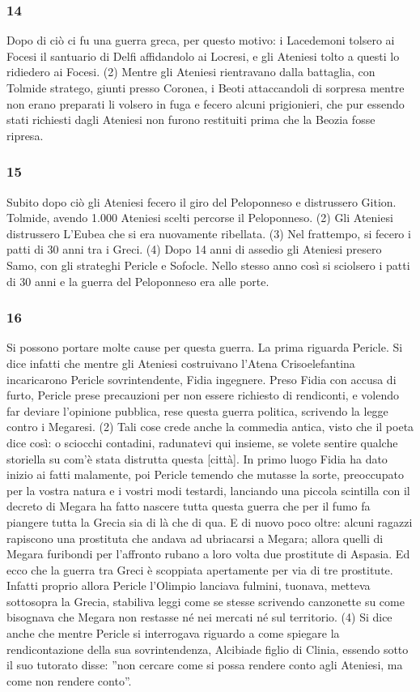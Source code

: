 \subsubsection*{14} Dopo di ciò ci fu una guerra greca, per questo motivo: i Lacedemoni tolsero ai Focesi il santuario di Delfi affidandolo ai Locresi, e gli Ateniesi tolto a questi lo ridiedero ai Focesi. (2)  Mentre gli Ateniesi rientravano dalla battaglia, con Tolmide stratego, giunti presso Coronea, i Beoti attaccandoli di sorpresa mentre non erano preparati li volsero in fuga e fecero alcuni prigionieri, che pur essendo stati richiesti dagli Ateniesi non furono restituiti prima che la Beozia fosse ripresa. 

\subsubsection*{15} Subito dopo ciò gli Ateniesi fecero il giro del Peloponneso e distrussero Gition. Tolmide, avendo 1.000 Ateniesi scelti percorse il Peloponneso. (2) Gli Ateniesi distrussero L'Eubea che si era nuovamente ribellata. (3) Nel frattempo, si fecero i patti di 30 anni tra i Greci. (4) Dopo 14 anni di assedio gli Ateniesi presero Samo, con gli strateghi Pericle e Sofocle. Nello stesso anno così si sciolsero i patti di 30 anni e la guerra del Peloponneso era alle porte.

\subsubsection*{16} Si possono portare molte cause per questa guerra. La prima riguarda Pericle. Si dice infatti che mentre gli Ateniesi costruivano l'Atena Crisoelefantina incaricarono Pericle sovrintendente, Fidia ingegnere. Preso Fidia con accusa di furto, Pericle prese precauzioni per non essere richiesto di rendiconti, e volendo far deviare l'opinione pubblica, rese questa guerra politica, scrivendo la legge contro i Megaresi. (2) Tali cose crede anche la commedia antica, visto che il poeta dice così: o sciocchi contadini, radunatevi qui insieme, se volete sentire qualche storiella su com'è stata distrutta questa [città]. In primo luogo Fidia ha dato inizio ai fatti malamente, poi Pericle temendo che mutasse la sorte, preoccupato per la vostra natura e i vostri modi testardi, lanciando una piccola scintilla con il decreto di Megara ha fatto nascere tutta questa guerra che per il fumo fa piangere tutta la Grecia sia di là che di qua. E di nuovo poco oltre: alcuni ragazzi rapiscono una prostituta che andava ad ubriacarsi a Megara; allora quelli di Megara furibondi per l'affronto rubano a loro volta due prostitute di Aspasia. Ed ecco che la guerra tra Greci è scoppiata apertamente per via di tre prostitute. Infatti proprio allora Pericle l'Olimpio lanciava fulmini, tuonava, metteva sottosopra la Grecia, stabiliva leggi come se stesse scrivendo canzonette su come bisognava che Megara non restasse né nei mercati né sul territorio.
(4) Si dice anche che mentre Pericle si interrogava riguardo a come spiegare la rendicontazione della sua sovrintendenza, Alcibiade figlio di Clinia, essendo sotto il suo tutorato disse: ''non cercare come si possa rendere conto agli Ateniesi, ma come non rendere conto”.

